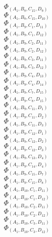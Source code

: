 \documentclass[14pt]{article}
\begin{document}
    $\Phi_{({A}_{1}, {B}_{8}, {C}_{15}, {D}_{9})}$ \\ 
    $\Phi_{({A}_{1}, {B}_{8}, {C}_{15}, {D}_{10})}$ \\ 
    $\Phi_{({A}_{1}, {B}_{9}, {C}_{1}, {D}_{11})}$ \\ 
    $\Phi_{({A}_{1}, {B}_{9}, {C}_{1}, {D}_{12})}$ \\ 
    $\Phi_{({A}_{1}, {B}_{9}, {C}_{2}, {D}_{11})}$ \\ 
    $\Phi_{({A}_{1}, {B}_{9}, {C}_{2}, {D}_{12})}$ \\ 
    $\Phi_{({A}_{1}, {B}_{9}, {C}_{3}, {D}_{11})}$ \\ 
    $\Phi_{({A}_{1}, {B}_{9}, {C}_{3}, {D}_{12})}$ \\ 
    $\Phi_{({A}_{1}, {B}_{9}, {C}_{4}, {D}_{13})}$ \\ 
    $\Phi_{({A}_{1}, {B}_{9}, {C}_{4}, {D}_{14})}$ \\ 
    $\Phi_{({A}_{1}, {B}_{9}, {C}_{7}, {D}_{15})}$ \\ 
    $\Phi_{({A}_{1}, {B}_{9}, {C}_{8}, {D}_{15})}$ \\ 
    $\Phi_{({A}_{1}, {B}_{9}, {C}_{11}, {D}_{1})}$ \\ 
    $\Phi_{({A}_{1}, {B}_{9}, {C}_{11}, {D}_{2})}$ \\ 
    $\Phi_{({A}_{1}, {B}_{9}, {C}_{11}, {D}_{3})}$ \\ 
    $\Phi_{({A}_{1}, {B}_{9}, {C}_{12}, {D}_{1})}$ \\ 
    $\Phi_{({A}_{1}, {B}_{9}, {C}_{12}, {D}_{2})}$ \\ 
    $\Phi_{({A}_{1}, {B}_{9}, {C}_{12}, {D}_{3})}$ \\ 
    $\Phi_{({A}_{1}, {B}_{9}, {C}_{13}, {D}_{4})}$ \\ 
    $\Phi_{({A}_{1}, {B}_{9}, {C}_{14}, {D}_{4})}$ \\ 
    $\Phi_{({A}_{1}, {B}_{9}, {C}_{15}, {D}_{7})}$ \\ 
    $\Phi_{({A}_{1}, {B}_{9}, {C}_{15}, {D}_{8})}$ \\ 
    $\Phi_{({A}_{1}, {B}_{10}, {C}_{1}, {D}_{11})}$ \\ 
    $\Phi_{({A}_{1}, {B}_{10}, {C}_{1}, {D}_{12})}$ \\ 
    $\Phi_{({A}_{1}, {B}_{10}, {C}_{2}, {D}_{11})}$ \\ 
    $\Phi_{({A}_{1}, {B}_{10}, {C}_{2}, {D}_{12})}$ \\ 
    $\Phi_{({A}_{1}, {B}_{10}, {C}_{3}, {D}_{11})}$ \\ 
    $\Phi_{({A}_{1}, {B}_{10}, {C}_{3}, {D}_{12})}$ \\ 
\end{document}
